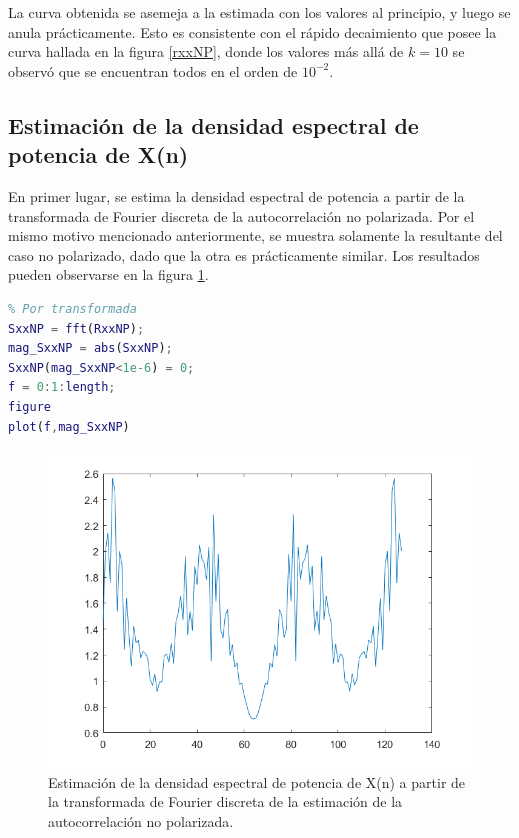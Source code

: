 La curva obtenida se asemeja a la estimada con los valores al principio, y luego se anula prácticamente. Esto es consistente con el rápido decaimiento que posee la curva hallada en la figura \ref{rxxNP}, donde los valores más allá de $k=10$ se observó que se encuentran todos en el orden de $10^{-2}$.

\subsection{Estimaci\'on de la densidad espectral de potencia de X(n)}

En primer lugar, se estima la densidad espectral de potencia a partir de la transformada de Fourier discreta de la autocorrelación no polarizada. Por el mismo motivo mencionado anteriormente, se muestra solamente la resultante del caso no polarizado, dado que la otra es prácticamente similar. Los resultados pueden observarse en la figura \ref{densidadEs}.

\begin{lstlisting}[language=Matlab, caption=EJ1.m]
%% ITEM 5
% Por transformada
SxxNP = fft(RxxNP);
mag_SxxNP = abs(SxxNP);
SxxNP(mag_SxxNP<1e-6) = 0;
f = 0:1:length;
figure
plot(f,mag_SxxNP)
\end{lstlisting}

\begin{figure}[H] %
\centering
\includegraphics[scale=0.45]{../EJ1/densidadEspectralFourierDiscNP}
\caption{Estimaci\'on de la densidad espectral de potencia  de X(n) a partir de la transformada de Fourier discreta de la estimaci\'on de la autocorrelación no polarizada.}
\label{densidadEs}
\end{figure}

